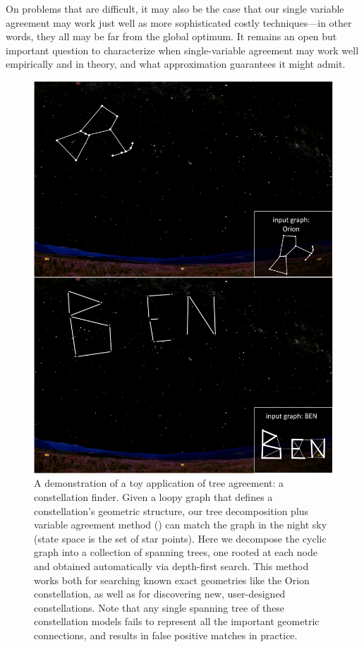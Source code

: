 On problems that are difficult, it may also be the case that our single 
variable agreement may work just well as more sophisticated costly 
techniques---in other words, they all may be far from the global optimum.  It 
remains an open but important question to characterize when single-variable 
agreement may work well empirically and in theory, and what approximation 
guarantees it might admit.


\begin{figure}[p!]
\centering
\includegraphics[width=0.80\linewidth]{figs/constellation-demo.pdf}
\caption[Constellation finder app.]{
\label{fig:constellation-demo} {\footnotesize A demonstration of a toy 
application of tree agreement: a constellation finder.  Given a loopy graph 
that defines a constellation's geometric structure, our tree decomposition plus 
variable agreement method () can match the graph in the 
night sky (state space is the set of star points).  Here we decompose the 
cyclic graph into a collection of spanning trees, one rooted at each node and 
obtained automatically via depth-first search. This method  works both for 
searching known exact geometries like the Orion constellation, as well as for 
discovering new, user-designed constellations.  Note that any single spanning 
tree of these constellation models fails to represent all the important 
geometric connections, and results in false positive matches in practice. }}
\end{figure}


